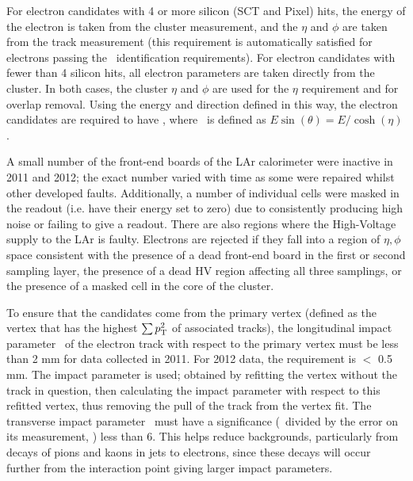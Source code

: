 For electron candidates with 4 or more silicon (SCT and Pixel) hits, the energy
of the electron is taken from the cluster measurement, and the $\eta$ and $\phi$
are taken from the track measurement (this requirement is automatically
satisfied for electrons passing the \loosePP\ identification requirements). For
electron candidates with fewer than 4 silicon hits, all electron parameters are
taken directly from the cluster. In both cases, the cluster $\eta$ and $\phi$
are used for the $\eta$ requirement and for overlap removal. Using the energy
and direction defined in this way, the electron candidates are required to have
, where \et\ is defined as $E\sin(\theta)=E/\cosh(\eta)$. 

A small number of the front-end boards of the LAr calorimeter were
inactive in 2011 and 2012; the exact number varied with time as some were
repaired whilst other developed faults. Additionally, a number of individual
cells were masked in the readout (i.e. have their energy set to zero) due to
consistently producing high noise or failing to give a readout. There are also
regions where the High-Voltage supply to the LAr is faulty. Electrons are
rejected if they fall into a region of $\eta, \phi$ space consistent with the
presence of a dead front-end board in the first or second sampling layer, the
presence of a dead HV region affecting all three samplings, or the presence of a
masked cell in the core of the cluster.

To ensure that the candidates come from the primary vertex (defined as the
vertex that has the highest $\sum{\ensuremath{p_{\mathrm{T}}}^2}$ of associated tracks), the
longitudinal impact parameter \zzero\ of the electron track with respect to the
primary vertex must be less than 2 mm for data collected in 2011. For 2012 data,
the requirement is \zzerosintheta $<$ 0.5 mm. The  impact
parameter is used; obtained by refitting the vertex without the track in
question, then calculating the impact parameter with respect to this refitted
vertex, thus removing the pull of the track from the vertex fit.  The transverse
impact parameter \dzero\ must have a significance (\dzero\ divided by the error
on its measurement, \dzerosig) less than 6. This helps reduce backgrounds,
particularly from decays of pions and kaons in jets to electrons, since these
decays will occur further from the interaction point giving larger impact
parameters.


